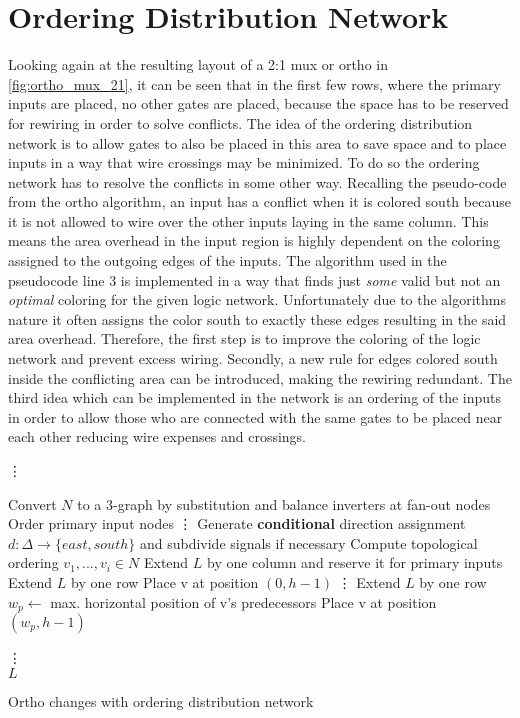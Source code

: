 \section{Ordering Distribution Network}
Looking again at the resulting layout of a 2:1 mux or ortho in \ref{fig:ortho_mux_21}, it can be seen that in the first few rows, where the primary inputs are placed, no other gates are placed, because the space has to be reserved for rewiring in order to solve conflicts. The idea of the ordering distribution network is to allow gates to also be placed in this area to save space and to place inputs in a way that wire crossings may be minimized. To do so the ordering network has to resolve the conflicts in some other way. Recalling the pseudo-code from the ortho algorithm, an input has a conflict when it is colored south because it is not allowed to wire over the other inputs laying in the same column. This means the area overhead in the input region is highly dependent on the coloring assigned to the outgoing edges of the inputs. The algorithm used in the pseudocode line $3$ is implemented in a way that finds just \textit{some} valid but not an \textit{optimal} coloring for the given logic network. Unfortunately due to the algorithms nature it often assigns the color south to exactly these edges resulting in the said area overhead. Therefore, the first step is to improve the coloring of the logic network and prevent excess wiring. Secondly, a new rule for edges colored south inside the conflicting area can be introduced, making the rewiring redundant. The third idea which can be implemented in the network is an ordering of the inputs in order to allow those who are connected with the same gates to be placed near each other reducing wire expenses and crossings.

\begin{algorithm}[H]
	\vdots
	
	\begin{algorithmic}
		\State Convert $N$ to a 3-graph by substitution and balance inverters at fan-out nodes
		\State Order primary input nodes
		\State \vdots
		\State Generate \textbf{conditional} direction assignment $d : \Delta \rightarrow \{east, south\}$ and subdivide signals if necessary
		\State Compute topological ordering $v_1, . . . , v_i \in N$
		\State Extend $L$ by one column and reserve it for primary inputs
		\State Extend $L$ by one row
		\State Place v at position $(0, h - 1)$
		\State \vdots
		\State Extend $L$ by one row
		\EndIf
		\State $w_p \leftarrow$ max. horizontal position of v's predecessors
		\State Place v at position $(w _p, h - 1)$
		\EndIf
		
		\EndFor
		\State \vdots \\
		\Return $L$
	\end{algorithmic}
	\caption{Ortho changes with ordering distribution network}\label{alg:input_network}
\end{algorithm}

